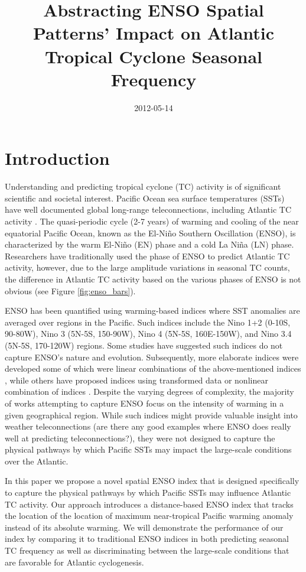 \documentclass[]{article}
\title{Abstracting ENSO Spatial Patterns' Impact on Atlantic Tropical Cyclone Seasonal Frequency}
\author{  }
\date{2012-05-14}
\begin{document}
\maketitle

\begin{abstract}
\end{abstract}
\section{Introduction}
Understanding and predicting tropical cyclone (TC) activity is of significant scientific and societal interest. Pacific Ocean sea surface temperatures (SSTs) have well documented global long-range teleconnections, including Atlantic TC activity \cite{gray1984a, bove1998,elsner2001b, emanuel2008, klotzbach2011nino}. The quasi-periodic cycle (2-7 years) of warming and cooling of the near equatorial Pacific Ocean, known as the El-Ni\~no Southern Oscillation (ENSO), is characterized by the warm El-Ni\~no (EN) phase and a cold La Ni\~na (LN) phase. Researchers have traditionally used the phase of ENSO to predict Atlantic TC activity, however, due to the large amplitude variations in seasonal TC counts, the difference in Atlantic TC activity based on the various phases of ENSO is not obvious (see Figure \ref{fig:enso_bars}).

ENSO has been quantified using warming-based indices where SST anomalies are averaged over regions in the Pacific. Such indices include the Nino 1+2 (0-10S, 90-80W), Nino 3 (5N-5S, 150-90W), Nino 4 (5N-5S, 160E-150W), and Nino 3.4 (5N-5S, 170-120W) regions. Some studies have suggested such indices do not capture ENSO's nature and evolution. Subsequently, more elaborate indices were developed some of which were linear combinations of the above-mentioned indices \cite{trenberth2001}, while others have proposed indices using transformed data or nonlinear combination of indices \cite{ren2011}. Despite the varying degrees of complexity, the majority of works attempting to capture ENSO focus on the intensity of warming in a given geographical region. While such indices might provide valuable insight into weather teleconnections (are there any good examples where ENSO does really well at predicting teleconnections?), they were not designed to capture the physical pathways by which Pacific SSTs may impact the large-scale conditions over the Atlantic.

In this paper we propose a novel spatial ENSO index that is designed specifically to capture the physical pathways by which Pacific SSTs may influence Atlantic TC activity. Our approach introduces a distance-based ENSO index that tracks the location of 
the location of maximum near-tropical Pacific warming anomaly instead of its absolute warming. We will demonstrate the performance of our index by comparing it to traditional ENSO indices in both predicting seasonal TC frequency as well as discriminating between the large-scale conditions that are favorable for Atlantic cyclogenesis.
\end{document}
